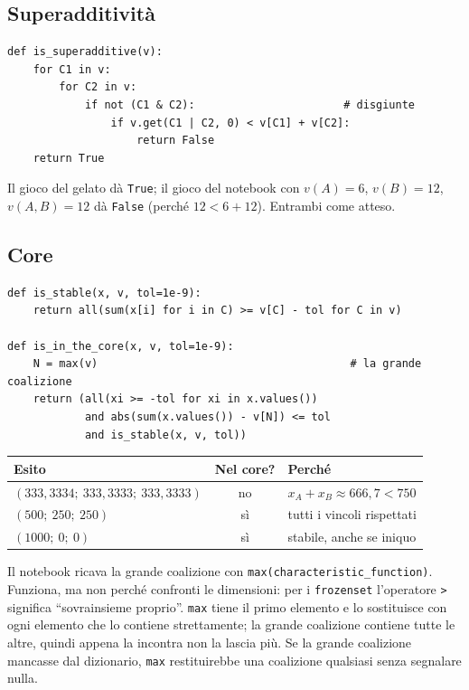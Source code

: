 \subsection{Superadditività}

\begin{lstlisting}
def is_superadditive(v):
    for C1 in v:
        for C2 in v:
            if not (C1 & C2):                       # disgiunte
                if v.get(C1 | C2, 0) < v[C1] + v[C2]:
                    return False
    return True
\end{lstlisting}
Il gioco del gelato dà \texttt{True}; il gioco del notebook con $v(A) = 6$, $v(B) = 12$,
$v(A,B) = 12$ dà \texttt{False} (perché $12 < 6 + 12$). Entrambi come atteso.

\subsection{Core}

\begin{lstlisting}
def is_stable(x, v, tol=1e-9):
    return all(sum(x[i] for i in C) >= v[C] - tol for C in v)

def is_in_the_core(x, v, tol=1e-9):
    N = max(v)                                       # la grande coalizione
    return (all(xi >= -tol for xi in x.values())
            and abs(sum(x.values()) - v[N]) <= tol
            and is_stable(x, v, tol))
\end{lstlisting}

\begin{center}
\renewcommand{\arraystretch}{1.2}
\begin{tabular}{lcl}
\toprule
Esito & Nel core? & Perché \\
\midrule
$(333{,}3334;\ 333{,}3333;\ 333{,}3333)$ & no & $x_A + x_B \approx 666{,}7 < 750$ \\
$(500;\ 250;\ 250)$ & sì & tutti i vincoli rispettati \\
$(1000;\ 0;\ 0)$ & sì & stabile, anche se iniquo \\
\bottomrule
\end{tabular}
\end{center}

\begin{attenzione}
Il notebook ricava la grande coalizione con \texttt{max(characteristic\_function)}. Funziona,
ma non perché confronti le dimensioni: per i \texttt{frozenset} l'operatore \texttt{>}
significa ``sovrainsieme proprio''. \texttt{max} tiene il primo elemento e lo sostituisce
con ogni elemento che lo contiene strettamente; la grande coalizione contiene tutte le altre,
quindi appena la incontra non la lascia più. Se la grande coalizione mancasse dal dizionario,
\texttt{max} restituirebbe una coalizione qualsiasi senza segnalare nulla.
\end{attenzione}

